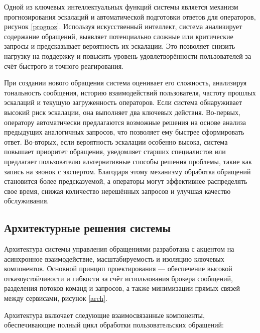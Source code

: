 Одной из ключевых интеллектуальных функций системы является механизм прогнозирования эскалаций и автоматической подготовки ответов для операторов, рисунок \ref{prognoz}. Используя искусственный интеллект, система анализирует содержание обращений, выявляет потенциально сложные или критические запросы и предсказывает вероятность их эскалации. Это позволяет снизить нагрузку на поддержку и повысить уровень удовлетворённости пользователей за счёт быстрого и точного реагирования.


При создании нового обращения система оценивает его сложность, анализируя тональность сообщения, историю взаимодействий пользователя, частоту прошлых эскалаций и текущую загруженность операторов. Если система обнаруживает высокий риск эскалации, она выполняет два ключевых действия. Во-первых, оператору автоматически предлагаются возможные решения на основе анализа предыдущих аналогичных запросов, что позволяет ему быстрее сформировать ответ. Во-вторых, если вероятность эскалации особенно высока, система повышает приоритет обращения, уведомляет старших специалистов или предлагает пользователю альтернативные способы решения проблемы, такие как запись на звонок с экспертом. Благодаря этому механизму обработка обращений становится более предсказуемой, а операторы могут эффективнее распределять свое время, снижая количество нерешённых запросов и улучшая качество обслуживания.

\subsection{Архитектурные решения системы}

Архитектура системы управления обращениями разработана с акцентом на асинхронное взаимодействие, масштабируемость и изоляцию ключевых компонентов. Основной принцип проектирования — обеспечение высокой отказоустойчивости и гибкости за счёт использования брокера сообщений, разделения потоков команд и запросов, а также минимизации прямых связей между сервисами, рисунок \ref{arch}.


Архитектура включает следующие взаимосвязанные компоненты, обеспечивающие полный цикл обработки пользовательских обращений:

